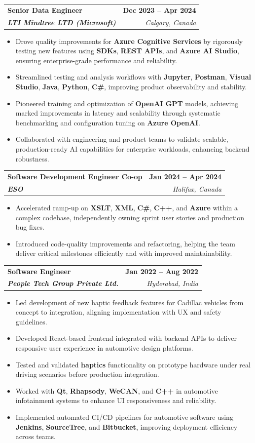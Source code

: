 \documentclass[letterpaper,11pt]{article}
\makeatletter
\newcommand{\resumeItem}[1]{
  \item\small{
    {#1 \vspace{-2pt}}
  }
}
\newcommand{\resumeSubheading}[4]{
  \vspace{-2pt}\item
    \begin{tabular*}{1.0\textwidth}[t]{l@{\extracolsep{\fill}}r}
      \textbf{#1} & \textbf{\small #2} \\
      \textit{\small#3} & \textit{\small #4} \\
    \end{tabular*}\vspace{-7pt}
}
\newcommand{\resumeItemListStart}{\begin{itemize}}
\newcommand{\resumeItemListEnd}{\end{itemize}\vspace{-5pt}}
\makeatother
\begin{document}
    \resumeSubheading
      {\textbf{Senior Data Engineer}}{\textbf{Dec 2023 -- Apr 2024}}
      {\textbf{LTI Mindtree LTD (Microsoft)}}{Calgary, Canada}
      \resumeItemListStart
        \resumeItem{Drove quality improvements for \textbf{Azure Cognitive Services} by rigorously testing new features using \textbf{SDKs}, \textbf{REST APIs}, and \textbf{Azure AI Studio}, ensuring enterprise-grade performance and reliability.}
        \resumeItem{Streamlined testing and analysis workflows with \textbf{Jupyter}, \textbf{Postman}, \textbf{Visual Studio}, \textbf{Java}, \textbf{Python}, \textbf{C\#}, improving product observability and stability.}
        \resumeItem{Pioneered training and optimization of \textbf{OpenAI GPT} models, achieving marked improvements in latency and scalability through systematic benchmarking and configuration tuning on \textbf{Azure OpenAI}.}
        \resumeItem{Collaborated with engineering and product teams to validate scalable, production-ready AI capabilities for enterprise workloads, enhancing backend robustness.}
      \resumeItemListEnd
    
    \resumeSubheading
      {\textbf{Software Development Engineer Co-op}}{\textbf{Jan 2024 -- Apr 2024}}
      {\textbf{ESO}}{Halifax, Canada}
      \resumeItemListStart
        \resumeItem{Accelerated ramp-up on \textbf{XSLT}, \textbf{XML}, \textbf{C\#}, \textbf{C++}, and \textbf{Azure} within a complex codebase, independently owning sprint user stories and production bug fixes.}
        \resumeItem{Introduced code-quality improvements and refactoring, helping the team deliver critical milestones efficiently and with improved maintainability.}
      \resumeItemListEnd

    \resumeSubheading
      {\textbf{Software Engineer}}{\textbf{Jan 2022 -- Aug 2022}}
      {\textbf{People Tech Group Private Ltd.}}{Hyderabad, India}
      \resumeItemListStart
        \resumeItem{Led development of new haptic feedback features for Cadillac vehicles from concept to integration, aligning implementation with UX and safety guidelines.}
        \resumeItem{Developed React-based frontend integrated with backend APIs to deliver responsive user experience in automotive design platforms.}
        \resumeItem{Tested and validated \textbf{haptics} functionality on prototype hardware under real driving scenarios before production integration.}
        \resumeItem{Worked with \textbf{Qt}, \textbf{Rhapsody}, \textbf{WeCAN}, and \textbf{C++} in automotive infotainment systems to enhance UI responsiveness and reliability.}
        \resumeItem{Implemented automated CI/CD pipelines for automotive software using \textbf{Jenkins}, \textbf{SourceTree}, and \textbf{Bitbucket}, improving deployment efficiency across teams.}
      \resumeItemListEnd
\end{document}
